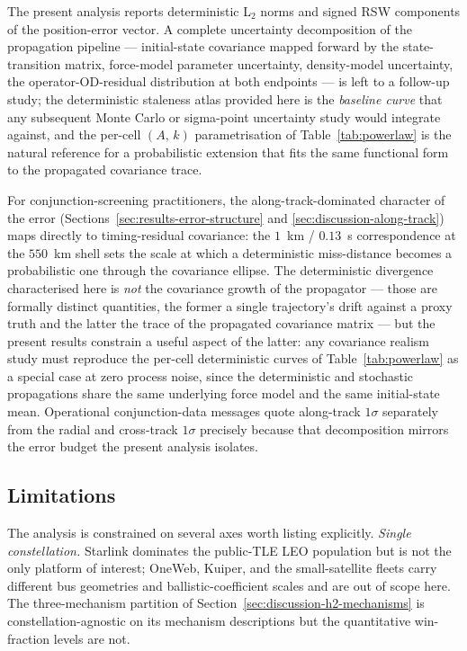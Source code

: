 \documentclass[10pt, letterpaper]{article}
\begin{document}
The present analysis reports deterministic L$_{2}$ norms and signed
RSW components of the position-error vector. A complete uncertainty
decomposition of the propagation pipeline --- initial-state
covariance mapped forward by the state-transition matrix,
force-model parameter uncertainty, density-model uncertainty, the
operator-OD-residual distribution at both endpoints --- is left to
a follow-up study; the deterministic staleness atlas provided here
is the \emph{baseline curve} that any subsequent Monte Carlo or
sigma-point uncertainty study would integrate against, and the
per-cell $(A,\,k)$ parametrisation of Table~\ref{tab:powerlaw} is
the natural reference for a probabilistic extension that fits the
same functional form to the propagated covariance trace.

For conjunction-screening practitioners, the along-track-dominated
character of the error
(Sections~\ref{sec:results-error-structure} and
\ref{sec:discussion-along-track}) maps directly to
timing-residual covariance: the $1$~km / $0.13$~s
correspondence at the $550$~km shell sets the scale at which a
deterministic miss-distance becomes a probabilistic one through
the covariance ellipse. The deterministic divergence
characterised here is \emph{not} the covariance growth of the
propagator --- those are formally distinct quantities, the former
a single trajectory's drift against a proxy truth and the latter
the trace of the propagated covariance matrix --- but the present
results constrain a useful aspect of the latter: any covariance
realism study must reproduce the per-cell deterministic curves of
Table~\ref{tab:powerlaw} as a special case at zero process noise,
since the deterministic and stochastic propagations share the same
underlying force model and the same initial-state mean. Operational conjunction-data
messages quote along-track $1\sigma$ separately from the radial
and cross-track $1\sigma$ precisely because that decomposition
mirrors the error budget the present analysis isolates.

\subsection{Limitations}
\label{sec:discussion-limitations}

The analysis is constrained on several axes worth listing
explicitly. \emph{Single constellation.} Starlink dominates the
public-TLE LEO population but is not the only platform of
interest; OneWeb, Kuiper, and the small-satellite fleets carry
different bus geometries and ballistic-coefficient scales and are
out of scope here. The three-mechanism partition of
Section~\ref{sec:discussion-h2-mechanisms} is constellation-agnostic
on its mechanism descriptions but the quantitative win-fraction
levels are not.
\end{document}
